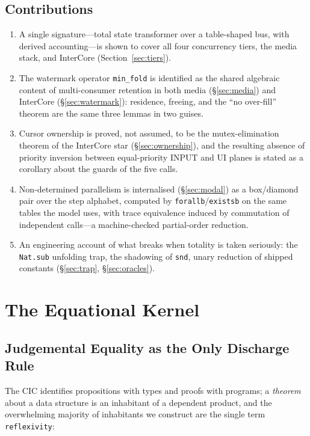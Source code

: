 \documentclass[10pt,journal,compsoc,twocolumn]{article}
\theoremstyle{definition}
\theoremstyle{remark}
\theoremstyle{plain}
\newcommand{\CIC}{\textsc{CIC}}
\newcommand{\ctr}[1]{\texttt{#1}}
\begin{document}
\subsection{Contributions}
\begin{enumerate}[leftmargin=*]
    \item A single signature---total state transformer over a table-shaped bus, with derived accounting---is shown to cover all four concurrency tiers, the media stack, and InterCore (Section~\ref{sec:tiers}).
    \item The watermark operator \ctr{min\_fold} is identified as the shared algebraic content of multi-consumer retention in both media (\S\ref{sec:media}) and InterCore (\S\ref{sec:watermark}): residence, freeing, and the ``no over-fill'' theorem are the same three lemmas in two guises.
    \item Cursor ownership is proved, not assumed, to be the mutex-elimination theorem of the InterCore star (\S\ref{sec:ownership}), and the resulting absence of priority inversion between equal-priority INPUT and UI planes is stated as a corollary about the guards of the five calls.
    \item Non-determined parallelism is internalised (\S\ref{sec:modal}) as a box/diamond pair over the step alphabet, computed by \ctr{forallb}/\ctr{existsb} on the same tables the model uses, with trace equivalence induced by commutation of independent calls---a machine-checked partial-order reduction.
    \item An engineering account of what breaks when totality is taken seriously: the \ctr{Nat.sub} unfolding trap, the shadowing of \ctr{snd}, unary reduction of shipped constants (\S\ref{sec:trap}, \S\ref{sec:oracles}).
\end{enumerate}

\section{The Equational Kernel}
\label{sec:kernel}

\subsection{Judgemental Equality as the Only Discharge Rule}
The \CIC{} identifies propositions with types and proofs with programs; a \emph{theorem} about a data structure is an inhabitant of a dependent product, and the overwhelming majority of inhabitants we construct are the single term \ctr{reflexivity}:
\end{document}

